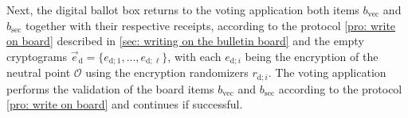 Next, the digital ballot box returns to the voting application both items $b_\mathrm{vec}$ and $b_\mathrm{sec}$ together with their respective receipts, according to the protocol \ref{pro: write on board} described in \cref{sec: writing on the bulletin board} and the empty cryptograms $\vec{e}_\mathrm{d} = \{ e_{\mathrm{d}; 1}, ..., e_{\mathrm{d}; \ell} \}$, with each $e_{\mathrm{d}; i}$ being the encryption of the neutral point $\mathcal{O}$ using the encryption randomizers $r_{\mathrm{d}; i}$. The voting application performs the validation of the board items $b_\mathrm{vec}$ and $b_\mathrm{sec}$ according to the protocol \ref{pro: write on board} and continues if successful.

\begin{figure}[ht]
    \centering
\end{figure}
